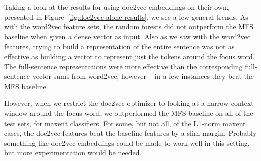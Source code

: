 Taking a look at the results for using doc2vec embeddings on their own,
presented in Figure~\ref{fig:doc2vec-alone-results}, we see a few general
trends. As with the word2vec feature sets, the random forests did not
outperform the MFS baseline when given a dense vector as input. Also as we saw
with the word2vec features, trying to build a representation of the
entire sentence was not as effective as building a vector to represent just the
tokens around the focus word.
The full-sentence representations were more effective than the corresponding
full-sentence vector sums from word2vec, however -- in a few instances they
beat the MFS baseline.

However, when we restrict the doc2vec optimizer to looking at a narrow context
window around the focus word, we outperformed the MFS baseline on all of the
test sets, for maxent classifiers. For some, but not all, of the L1-norm
maxent cases, the doc2vec features beat the baseline features by a slim margin.
Probably something like doc2vec embeddings could be made to work well in this
setting, but more experimentation would be needed.

